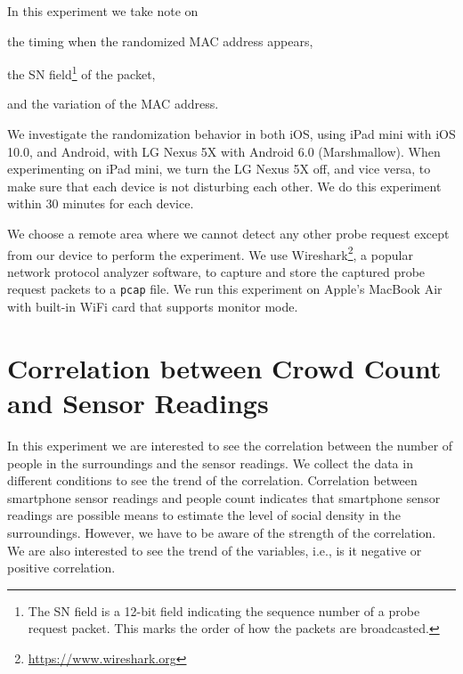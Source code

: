 In this experiment we take note on 
\begin{enumerate*}[label={\alph*)},font={\color{red!50!black}\bfseries}]
  \item the timing when the randomized MAC address appears,
  \item the \ac{SN} field\footnote{The \ac{SN} field is a 12-bit field indicating the sequence number of a probe request packet. This marks the order of how the packets are broadcasted.} of the packet,
  \item and the variation of the \ac{MAC} address.
\end{enumerate*}

We investigate the randomization behavior in both iOS, using iPad mini with iOS 10.0, and Android, with LG Nexus 5X with Android 6.0 (Marshmallow). When experimenting on iPad mini, we turn the LG Nexus 5X off, and vice versa, to make sure that each device is not disturbing each other. We do this experiment within 30 minutes for each device.

We choose a remote area where we cannot detect any other probe request except from our device to perform the experiment. We use Wireshark\footnote{\url{https://www.wireshark.org}}, a popular network protocol analyzer software, to capture and store the captured probe request packets to a \verb|pcap| file. We run this experiment on Apple's MacBook Air with built-in WiFi card that supports monitor mode.











\section{Correlation between Crowd Count and Sensor Readings} %
\label{sec:crowd_count_correlation}
In this experiment we are interested to see the correlation between the number of people in the surroundings and the sensor readings. We collect the data in different conditions to see the trend of the correlation. Correlation between smartphone sensor readings and people count indicates that smartphone sensor readings are possible means to estimate the level of social density in the surroundings. However, we have to be aware of the strength of the correlation. We are also interested to see the trend of the variables, i.e., is it negative or positive correlation.

